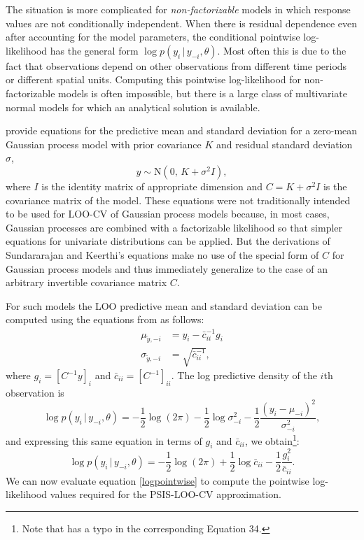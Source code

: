 \documentclass[11pt]{article}
\begin{document}
The situation is more complicated for \emph{non-factorizable} models in which
response values are not conditionally independent. When there is residual
dependence even after accounting for the model parameters, the conditional
pointwise log-likelihood has the general form $\log p(y_i \,|\, y_{-i},
\theta)$. Most often this is due to the fact that observations depend on other
observations from different time periods or different spatial units. Computing
this pointwise log-likelihood for non-factorizable models is often impossible,
but there is a large class of multivariate normal models for which an analytical
solution is available.

\cite{sundararajan2001} provide equations for the predictive mean and standard
deviation for a zero-mean Gaussian process model with prior covariance $K$ and
residual standard deviation $\sigma$,
%
\begin{equation}
y \sim {\mathrm N}(0, \, K+\sigma^2 I),
\end{equation}
%
where $I$ is the identity matrix of appropriate dimension and $C = K+\sigma^2 I$
is the covariance matrix of the model. These equations were not traditionally
intended to be used for LOO-CV of Gaussian process models because, in most
cases, Gaussian processes are combined with a factorizable likelihood so that
simpler equations for univariate distributions can be applied. But the
derivations of Sundararajan and Keerthi's equations make no use of the special
form of $C$ for Gaussian process models and thus immediately generalize to the
case of an arbitrary invertible covariance matrix $C$.

For such models the LOO predictive mean and standard deviation can be computed
using the equations from \cite{sundararajan2001} as follows:
%
\begin{align}
\label{ypredpars}
  \mu_{\tilde{y},-i} &= y_i-\bar{c}_{ii}^{-1} g_i \nonumber \\
  \sigma_{\tilde{y},-i} &= \sqrt{\bar{c}_{ii}^{-1}},
\end{align}
%
where $g_i = \left[C^{-1} y\right]_i$ and
$\bar{c}_{ii} = \left[C^{-1}\right]_{ii}$.
The log predictive density of the $i$th observation is
%
\begin{equation}
  \log p(y_i \,|\, y_{-i},\theta)
  = - \frac{1}{2}\log(2\pi)
  - \frac{1}{2}\log \sigma^2_{-i}
  - \frac{1}{2}\frac{(y_i-\mu_{-i})^2}{\sigma^2_{-i}},
\end{equation}
%
and expressing this same equation in terms of $g_i$ and $\bar{c}_{ii}$, we
obtain\footnote{ Note that \cite{vehtari2016} has a typo in the corresponding
Equation 34.}:
%
\begin{equation}
\label{logpointwise}
  \log p(y_i \,|\, y_{-i},\theta)
  = - \frac{1}{2}\log(2\pi)
  + \frac{1}{2}\log \bar{c}_{ii}
  - \frac{1}{2}\frac{g_i^2}{\bar{c}_{ii}}.
\end{equation}
%
We can now evaluate equation \eqref{logpointwise} to compute the pointwise
log-likelihood values required for the PSIS-LOO-CV approximation.
\end{document}
